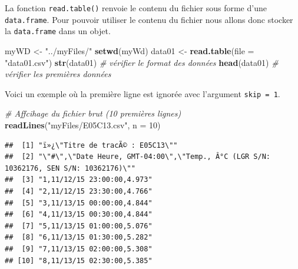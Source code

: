 \documentclass[
]{book}
\newenvironment{Shaded}{\begin{snugshade}}{\end{snugshade}}
\newcommand{\CommentTok}[1]{\textcolor[rgb]{0.56,0.35,0.01}{\textit{#1}}}
\newcommand{\DataTypeTok}[1]{\textcolor[rgb]{0.13,0.29,0.53}{#1}}
\newcommand{\DecValTok}[1]{\textcolor[rgb]{0.00,0.00,0.81}{#1}}
\newcommand{\KeywordTok}[1]{\textcolor[rgb]{0.13,0.29,0.53}{\textbf{#1}}}
\newcommand{\NormalTok}[1]{#1}
\newcommand{\StringTok}[1]{\textcolor[rgb]{0.31,0.60,0.02}{#1}}
\begin{document}
La fonction \texttt{read.table()} renvoie le contenu du fichier sous forme d'une \texttt{data.frame}. Pour pouvoir utiliser le contenu du fichier nous allons donc stocker la \texttt{data.frame} dans un objet.

\begin{Shaded}
\begin{Highlighting}[]
\NormalTok{myWD <-}\StringTok{ "../myFiles/"}
\KeywordTok{setwd}\NormalTok{(myWd)}
\NormalTok{data01 <-}\StringTok{ }\KeywordTok{read.table}\NormalTok{(}\DataTypeTok{file =} \StringTok{"data01.csv"}\NormalTok{)}
\KeywordTok{str}\NormalTok{(data01) }\CommentTok{# vérifier le format des données}
\KeywordTok{head}\NormalTok{(data01) }\CommentTok{# vérifier les premières données}
\end{Highlighting}
\end{Shaded}

Voici un exemple où la première ligne est ignorée avec l'argument \texttt{skip\ =\ 1}.

\begin{Shaded}
\begin{Highlighting}[]
\CommentTok{# Affcihage du fichier brut (10 premières lignes)}
\KeywordTok{readLines}\NormalTok{(}\StringTok{"myFiles/E05C13.csv"}\NormalTok{, }\DataTypeTok{n =} \DecValTok{10}\NormalTok{)}
\end{Highlighting}
\end{Shaded}

\begin{verbatim}
##  [1] "ï»¿\"Titre de tracÃ© : E05C13\""                                                      
##  [2] "\"#\",\"Date Heure, GMT-04:00\",\"Temp., Â°C (LGR S/N: 10362176, SEN S/N: 10362176)\""
##  [3] "1,11/12/15 23:00:00,4.973"                                                            
##  [4] "2,11/12/15 23:30:00,4.766"                                                            
##  [5] "3,11/13/15 00:00:00,4.844"                                                            
##  [6] "4,11/13/15 00:30:00,4.844"                                                            
##  [7] "5,11/13/15 01:00:00,5.076"                                                            
##  [8] "6,11/13/15 01:30:00,5.282"                                                            
##  [9] "7,11/13/15 02:00:00,5.308"                                                            
## [10] "8,11/13/15 02:30:00,5.385"
\end{verbatim}
\end{document}
